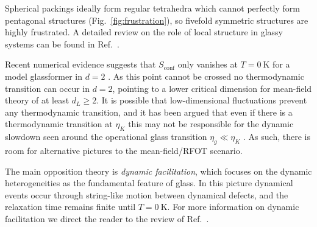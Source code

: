 \documentclass[11pt,twoside]{report}
\begin{document}
Spherical packings ideally form regular tetrahedra which cannot perfectly form pentagonal structures (Fig.\ \ref{fig:frustration}), so fivefold symmetric structures are highly frustrated.
A detailed review on the role of local structure in glassy systems can be found in Ref.\ \cite{RoyallPR2015}.

Recent numerical evidence suggests that $S_\mathrm{conf}$ only vanishes at $T=\SI{0}{\kelvin}$ for a model glassformer in $d=2$ \cite{BerthierNC2019}.
As this point cannot be crossed no thermodynamic transition can occur in $d = 2$, pointing to a lower critical dimension for mean-field theory of at least $d_L \ge 2$.
It is possible that low-dimensional fluctuations prevent any thermodynamic transition, and it has been argued that even if there is a thermodynamic transition at $\eta_K$ this may not be responsible for the dynamic slowdown seen around the operational glass transition $\eta_g \ll \eta_K$ \cite{WyartPRL2017}.
As such, there is room for alternative pictures to the mean-field/RFOT scenario.

The main opposition theory is \emph{dynamic facilitation}, which focuses on the dynamic heterogeneities as the fundamental feature of glass.
In this picture dynamical events occur through string-like motion between dynamical defects, and the relaxation time remains finite until $T = \SI{0}{\kelvin}$.
For more information on dynamic facilitation we direct the reader to the review of Ref.\ \cite{ChandlerARPC2010}.
\end{document}
